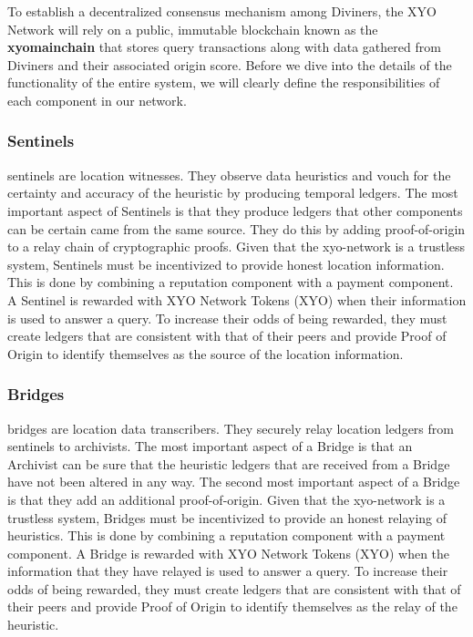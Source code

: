 \documentclass{article}
\begin{document}
To establish a decentralized consensus mechanism among Diviners, the XYO Network will rely on a public, immutable blockchain known as the \textbf{\Gls{xyomainchain}} that stores query transactions along with data gathered from Diviners and their associated origin score. Before we dive into the details of the functionality of the entire system, we will clearly define the responsibilities of each component in our network.

\subsubsection{Sentinels}

\Glspl{sentinel} are location witnesses. They observe data \glspl{heuristic} and vouch for the \gls{certainty} and \gls{accuracy} of the heuristic by producing temporal ledgers. The most important aspect of Sentinels is that they produce ledgers that other components can be certain came from the same source. They do this by adding \Gls{proof-of-origin} to a relay chain of cryptographic proofs. Given that the \Gls{xyo-network} is a \gls{trustless} system, Sentinels must be incentivized to provide honest location information. This is done by combining a reputation component with a payment component. A Sentinel is rewarded with XYO Network Tokens (XYO) when their information is used to answer a query. To increase their odds of being rewarded, they must create ledgers that are consistent with that of their peers and provide Proof of Origin to identify themselves as the source of the location information.

\subsubsection{Bridges}

\Glspl{bridge} are location data transcribers. They securely relay location ledgers from \Glspl{sentinel} to \Glspl{archivist}. The most important aspect of a Bridge is that an Archivist can be sure that the \gls{heuristic} ledgers that are received from a Bridge have not been altered in any way. The second most important aspect of a Bridge is that they add an additional \Gls{proof-of-origin}. Given that the \Gls{xyo-network} is a \gls{trustless} system, Bridges must be incentivized to provide an honest relaying of heuristics. This is done by combining a reputation component with a payment component. A Bridge is rewarded with XYO Network Tokens (XYO) when the information that they have relayed is used to answer a query. To increase their odds of being rewarded, they must create ledgers that are consistent with that of their peers and provide Proof of Origin to identify themselves as the relay of the heuristic.
\end{document}
